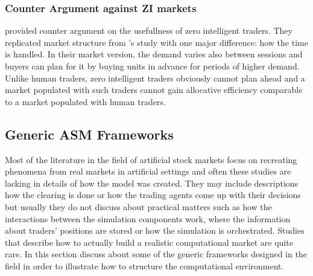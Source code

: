 \subsubsection{Counter Argument against ZI markets}
\citet{Mil08} provided counter argument on the usefullness of zero
intelligent traders. They replicated market structure from
\citeauthor{God93}'s study with one major difference: how the 
time is handled. In their market version, the demand varies
also between sessions and buyers can plan for it by buying units
in advance for periods of higher demand. Unlike human traders,
zero intelligent traders obviously cannot plan ahead and a market
populated with such traders cannot gain allocative efficiency comparable
to a market populated with human traders. 


\subsection{Generic ASM Frameworks}

Most of the literature in the field of artificial stock markets 
focus on recreating phenomena from real markets in artificial settings
and often these studies are lacking in details of how the model was created.
They may include descriptions how the clearing is done or how the trading agents 
come up with their decisions but usually they do not discuss about practical matters 
such as how the interactions between the simulation components work, where the 
information about traders' positions are stored or how the simulation is orchestrated. 
Studies that describe how to actually build a realistic computational 
market are quite rare. In this section discuss about some of the generic
frameworks designed in the field in order to illustrate how to structure the computational
environment.



